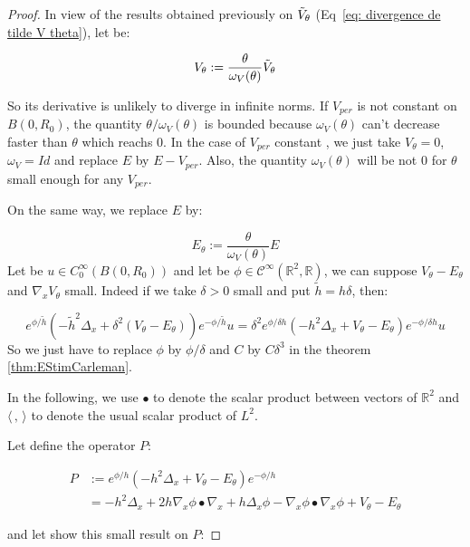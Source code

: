 \documentclass[leqno,11pt,letterpaper, english]{amsart}
\newcommand{\nn}{\nonumber}
\theoremstyle{plain}
\theoremstyle{definition}
\numberwithin{equation}{section}
\def\R{\mathbb R}
\begin{document}
\begin{proof}
In view of the results obtained previously on $\Tilde{V}_\theta$ (Eq~\ref{eq: divergence de tilde V theta}), let be:

\begin{equation}
    V_\theta := \frac{\theta}{\omega_V(\theta)}\Tilde{V}_\theta
\end{equation}

So its derivative is unlikely to diverge in infinite norms. If $V_{per}$ is not constant on $B(0,R_0)$, the quantity $\theta/\omega_V(\theta)$ is bounded because $\omega_V(\theta)$ can't decrease faster than $\theta$ which reachs $0$. In the case of $V_{per}$ constant , we just take $V_\theta =0$, $\omega_V=Id$ and replace $E$ by $E-V_{per}$. Also, the quantity $\omega_V(\theta)$ will be not $0$ for $\theta$ small enough for any $V_{per}$.

On the same way, we replace $E$ by:

\begin{equation}
    E_\theta := \frac{\theta}{\omega_V(\theta)}E
\end{equation}
Let be $u\in C_0^\infty (B(0,R_0))$ and let be $\phi \in \mathcal{C}^\infty(\R^2,\R)$, we can suppose $V_\theta -E_\theta$ and $\nabla_x V_\theta$ small. Indeed if we take $\delta>0$ small and put $\tilde{h}=h\delta$, then:

\begin{equation}
\label{eq: deltapetit}
e^{\phi/\tilde{h}}(-\tilde{h}^2\Delta_x +\delta^2(V_\theta -E_\theta))e^{-\phi/\tilde{h}}u= \delta^2 e^{\phi/\delta h}(-h^2\Delta_x +V_\theta -E_\theta)e^{-\phi/\delta h}u
\end{equation}
So we just have to replace $\phi$ by $\phi/\delta$ and $C$ by $C\delta^3$ in the theorem \ref{thm:EStimCarleman}.

In the following, we use $\bullet$ to denote the scalar product between vectors of $\mathbb{R}^2$ and $\langle \, , \, \rangle$ to denote the usual scalar product of $L^2$.

Let define the operator $P$:

\begin{align}
    P &:= e^{\phi/h}(-h^2\Delta_x +V_\theta-E_\theta) e^{-\phi/h}\nn\\
    &=-h^2\Delta_x +2h\nabla_x \phi \bullet \nabla_x + h\Delta_x \phi - \nabla_x \phi \bullet \nabla_x \phi +V_{\theta}-E_{\theta}
\end{align}

and let show this small result on $P$:


\end{proof}
\end{document}
